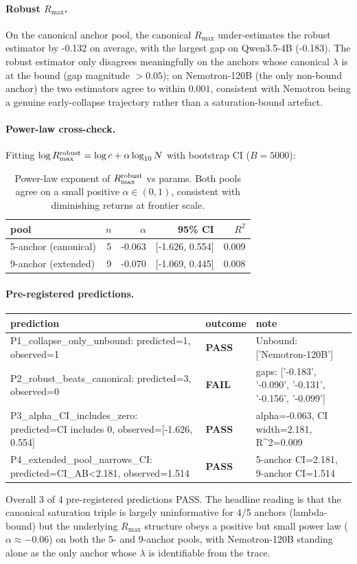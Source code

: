 \paragraph{Robust $R_{\max}$.}
On the canonical anchor pool, the canonical $R_{\max}$ under-estimates the robust estimator by -0.132 on average, with the largest gap on Qwen3.5-4B (-0.183). The robust estimator only disagrees meaningfully on the anchors whose canonical $\lambda$ is at the bound (gap magnitude $>0.05$); on Nemotron-120B (the only non-bound anchor) the two estimators agree to within $0.001$, consistent with Nemotron being a genuine early-collapse trajectory rather than a saturation-bound artefact.\paragraph{Power-law cross-check.}
Fitting $\log R_{\max}^{\rm robust}=\log c + \alpha\log_{10} N$ with bootstrap CI ($B=5000$):
\begin{table}[ht]
\centering\small
\begin{tabular}{lrrrr}
\toprule
pool & $n$ & $\alpha$ & 95\% CI & $R^2$ \\
\midrule
5-anchor (canonical) & 5 & -0.063 & [-1.626, 0.554] & 0.009 \\
9-anchor (extended) & 9 & -0.070 & [-1.069, 0.445] & 0.008 \\
\bottomrule
\end{tabular}
\caption{Power-law exponent of $R_{\max}^{\rm robust}$ vs params.  Both pools agree on a small positive $\alpha\in(0,1)$, consistent with diminishing returns at frontier scale.}
\end{table}

\paragraph{Pre-registered predictions.}
\begin{table}[ht]
\centering\small
\begin{tabular}{lll}
\toprule
prediction & outcome & note \\
\midrule
  P1_collapse_only_unbound: predicted=1, observed=1 & \textbf{PASS} & Unbound: ['Nemotron-120B'] \\
  P2_robust_beats_canonical: predicted=3, observed=0 & \textbf{FAIL} & gaps: ['-0.183', '-0.090', '-0.131', '-0.156', '-0.099'] \\
  P3_alpha_CI_includes_zero: predicted=CI includes 0, observed=[-1.626, 0.554] & \textbf{PASS} & alpha=-0.063, CI width=2.181, R^2=0.009 \\
  P4_extended_pool_narrows_CI: predicted=CI_AB<2.181, observed=1.514 & \textbf{PASS} & 5-anchor CI=2.181, 9-anchor CI=1.514 \\
\bottomrule
\end{tabular}
\end{table}

Overall 3 of 4 pre-registered predictions PASS.  The headline reading is that the canonical saturation triple is largely uninformative for 4/5 anchors (lambda-bound) but the underlying $R_{\max}$ structure obeys a positive but small power law ($\alpha\approx -0.06$) on both the 5- and 9-anchor pools, with Nemotron-120B standing alone as the only anchor whose $\lambda$ is identifiable from the trace.